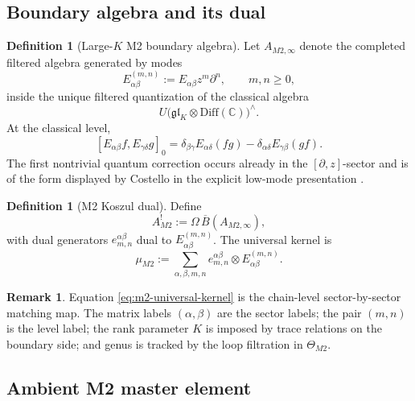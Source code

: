 \documentclass[11pt,oneside]{memoir}
\numberwithin{equation}{chapter}
\theoremstyle{definition}
\newtheorem{definition}[theorem]{Definition}
\newtheorem{remark}[theorem]{Remark}
\newcommand{\C}{\mathbb C}
\newcommand{\ov}[1]{\overline{#1}}
\begin{document}
\subsection{Boundary algebra and its dual}

\begin{definition}[Large-\(K\) M2 boundary algebra]
\label{def:m2-boundary-algebra}
Let \(A_{M2,\infty}\) denote the completed filtered algebra generated by modes
\[
E^{(m,n)}_{\alpha\beta}:=E_{\alpha\beta}z^m\partial^n,
\qquad m,n\ge 0,
\]
inside the unique filtered quantization of the classical algebra
\[
U\bigl(\mathfrak{gl}_K\otimes \mathrm{Diff}(\C)\bigr)^{\wedge}.
\]
At the classical level,
\[
[E_{\alpha\beta}f,E_{\gamma\delta}g]_0
=
\delta_{\beta\gamma}E_{\alpha\delta}(fg)-\delta_{\alpha\delta}E_{\gamma\beta}(gf).
\]
The first nontrivial quantum correction occurs already in the \([\partial,z]\)-sector and is of the form displayed by Costello in the explicit low-mode presentation \cite{CostelloM2}.
\end{definition}

\begin{definition}[M2 Koszul dual]
\label{def:m2-koszul-dual}
Define
\[
A^!_{M2}:=\Omega\,\ov B(A_{M2,\infty}),
\]
with dual generators \(e^{\alpha\beta}_{m,n}\) dual to \(E^{(m,n)}_{\alpha\beta}\).  The universal kernel is
\begin{equation}
\label{eq:m2-universal-kernel}
\mu_{M2}
:=
\sum_{\alpha,\beta,m,n}
 e^{\alpha\beta}_{m,n}\otimes E^{(m,n)}_{\alpha\beta}.
\end{equation}
\end{definition}

\begin{remark}
Equation \eqref{eq:m2-universal-kernel} is the chain-level sector-by-sector matching map.  The matrix labels \((\alpha,\beta)\) are the sector labels; the pair \((m,n)\) is the level label; the rank parameter \(K\) is imposed by trace relations on the boundary side; and genus is tracked by the loop filtration in \(\Theta_{M2}\).
\end{remark}

\subsection{Ambient M2 master element}
\end{document}

